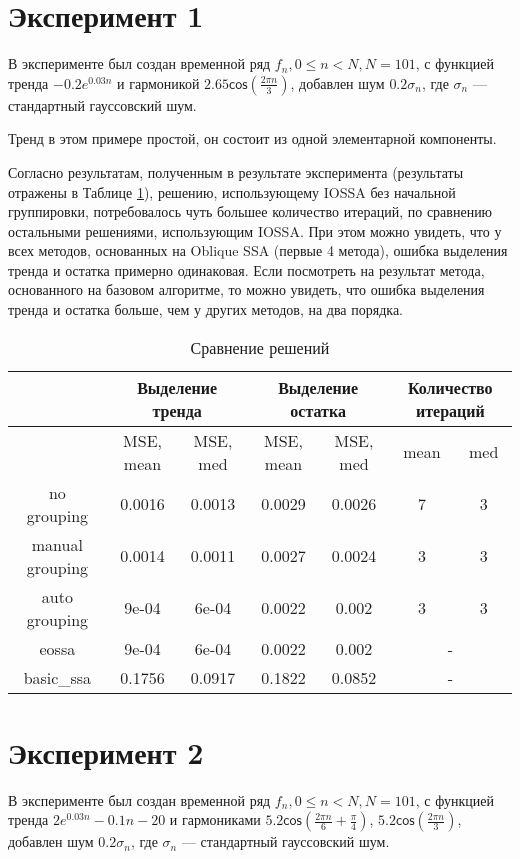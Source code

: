 \documentclass[specialist, substylefile = spbureport.rtx, subf,href,colorlinks=true, 12pt]{disser}
\theoremstyle{definition}
\begin{document}
\section{Эксперимент 1}
\label{exp1}
В эксперименте был создан временной ряд $f_n , 0\leq n < N, N=101$, с функцией тренда $-0.2 e^{0.03n}$ и гармоникой $2.65 \mathsf{cos}(\frac{2\pi n}{3})$, добавлен шум $0.2 \sigma_n$, где $\sigma_n$ --- стандартный гауссовский шум.

Тренд в этом примере простой, он состоит из одной элементарной компоненты.

Согласно результатам, полученным в результате эксперимента (результаты отражены в Таблице \ref{tabular:1}), решению, использующему IOSSA без начальной группировки, потребовалось чуть большее количество итераций, по сравнению остальными решениями, использующим IOSSA. При этом можно увидеть, что у всех методов, основанных на Oblique SSA (первые 4 метода), ошибка выделения тренда и остатка примерно одинаковая. Если посмотреть на результат метода, основанного на базовом алгоритме, то можно увидеть, что ошибка выделения тренда и остатка больше, чем у других методов, на два порядка.

\begin{table}[h]
\footnotesize
\caption{Сравнение решений}
\label{tabular:1}
\begin{center}
\begin{tabular}{|c | c| c| c| c| c| c|}
\hline
 \multirow{2}{}{}& \multicolumn{2}{c|}{Выделение тренда} & \multicolumn{2}{c|}{Выделение остатка} & \multicolumn{2}{c|}{Количество итераций} \\
 \hline
 & MSE, mean & MSE, med & MSE, mean & MSE, med & mean & med  \\
\hline
no grouping & 0.0016 &  0.0013 & 0.0029 &  0.0026 & 7 & 3 \\
manual grouping &  0.0014 & 0.0011 & 0.0027 & 0.0024 & 3 & 3 \\
auto grouping &  9e-04 & 6e-04 & 0.0022 & 0.002 & 3 & 3 \\
\hline
eossa & 9e-04 & 6e-04 & 0.0022 & 0.002 & \multicolumn{2}{c|}{-} \\
basic\_ssa &  0.1756 & 0.0917 & 0.1822 & 0.0852  & \multicolumn{2}{c|}{-} \\
\hline
\end{tabular}
\end{center}
\end{table}

\section{Эксперимент 2}
\label{exp2}
В эксперименте был создан временной ряд $f_n , 0\leq n < N, N=101$, с функцией тренда $2e^{0.03n} - 0.1n - 20$ и гармониками $5.2\mathsf{cos}(\frac{2\pi n}{6} + \frac{\pi}{4})$, $5.2\mathsf{cos}(\frac{2 \pi n} {3})$,  добавлен шум $0.2 \sigma_n$, где $\sigma_n$ --- стандартный гауссовский шум.
\end{document}
